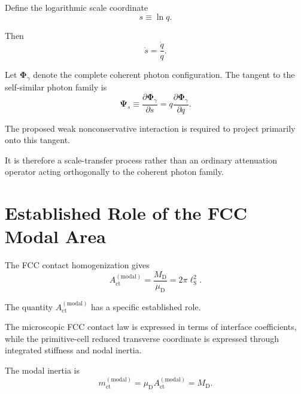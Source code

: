 Define the logarithmic scale coordinate
\begin{equation}
    s
    \equiv
    \ln q.
    \label{eq:AQ_sdef}
\end{equation}

Then
\begin{equation}
    \dot s
    =
    \frac{\dot q}{q}.
\end{equation}

Let
$\boldsymbol{\Phi}_{\gamma}$
denote the complete coherent photon configuration. The tangent to the
self-similar photon family is
\begin{equation}
    \boxed{
    \boldsymbol{\Psi}_s
    \equiv
    \frac{
        \partial\boldsymbol{\Phi}_{\gamma}
    }{
        \partial s
    }
    =
    q
    \frac{
        \partial\boldsymbol{\Phi}_{\gamma}
    }{
        \partial q
    }.
    }
    \label{eq:AQ_scale_tangent}
\end{equation}

The proposed weak nonconservative interaction is required to project primarily
onto this tangent.

It is therefore a scale-transfer process rather than an ordinary attenuation
operator acting orthogonally to the coherent photon family.


\section{Established Role of the FCC Modal Area}

The FCC contact homogenization gives
\begin{equation}
    \boxed{
    A_{\mathrm{ct}}^{(\mathrm{modal})}
    =
    \frac{M_{\mathrm D}}{\mu_{\mathrm D}}
    =
    2\pi\ell_{\mathrm S}^{2}.
    }
    \label{eq:AQ_modal_area}
\end{equation}

The quantity
$A_{\mathrm{ct}}^{(\mathrm{modal})}$
has a specific established role.

The microscopic FCC contact law is expressed in terms of interface
coefficients, while the primitive-cell reduced transverse coordinate is
expressed through integrated stiffness and nodal inertia.

The modal inertia is
\begin{equation}
    m_{\mathrm{ct}}^{(\mathrm{modal})}
    =
    \mu_{\mathrm D}
    A_{\mathrm{ct}}^{(\mathrm{modal})}
    =
    M_{\mathrm D}.
    \label{eq:AQ_modal_mass}
\end{equation}

